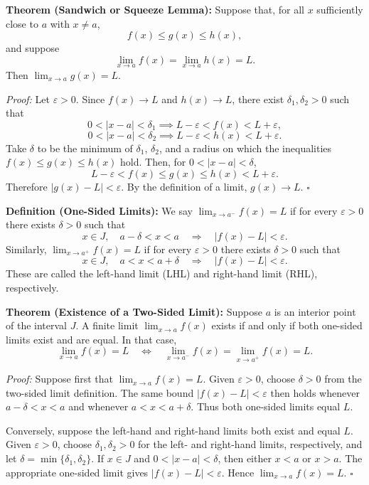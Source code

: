 \documentclass[a4paper,11pt,abstracton]{scrartcl}
\theoremstyle{dotlessP}
\theoremstyle{dotlessS}
\theoremstyle{remark}
\theoremstyle{definition}
\begin{document}
\begin{problem_box}
\textbf{Theorem (Sandwich or Squeeze Lemma):}
Suppose that, for all $x$ sufficiently close to $a$ with $x\ne a$,
\[
f(x)\le g(x)\le h(x),
\]
and suppose
\[
\lim_{x\to a}f(x)=\lim_{x\to a}h(x)=L.
\]
Then $\displaystyle\lim_{x\to a}g(x)=L$.
\end{problem_box}

\begin{claim_box}
\textit{Proof:}
Let $\varepsilon>0$. Since $f(x)\to L$ and $h(x)\to L$, there exist $\delta_1,\delta_2>0$ such that
\[
0<|x-a|<\delta_1\implies L-\varepsilon<f(x)<L+\varepsilon,
\]
\[
0<|x-a|<\delta_2\implies L-\varepsilon<h(x)<L+\varepsilon.
\]
Take $\delta$ to be the minimum of $\delta_1$, $\delta_2$, and a radius on which the inequalities $f(x)\le g(x)\le h(x)$ hold. Then, for $0<|x-a|<\delta$,
\[
L-\varepsilon<f(x)\le g(x)\le h(x)<L+\varepsilon.
\]
Therefore $|g(x)-L|<\varepsilon$. By the definition of a limit, $g(x)\to L$.
\hfill$\square$
\end{claim_box}

\begin{problem_box}
\textbf{Definition (One-Sided Limits):}
We say $\lim_{x\to a^-}f(x)=L$ if for every $\varepsilon>0$ there exists $\delta>0$ such that
\[
 x\in J,\quad a-\delta<x<a\quad\Longrightarrow\quad |f(x)-L|<\varepsilon.
\]
Similarly, $\lim_{x\to a^+}f(x)=L$ if for every $\varepsilon>0$ there exists $\delta>0$ such that
\[
 x\in J,\quad a<x<a+\delta\quad\Longrightarrow\quad |f(x)-L|<\varepsilon.
\]
These are called the left-hand limit (LHL) and right-hand limit (RHL), respectively.
\end{problem_box}

\begin{problem_box}
\textbf{Theorem (Existence of a Two-Sided Limit):}
Suppose $a$ is an interior point of the interval $J$. A finite limit $\lim_{x\to a}f(x)$ exists if and only if both one-sided limits exist and are equal. In that case,
\[
\lim_{x\to a}f(x)=L
\quad\Longleftrightarrow\quad
\lim_{x\to a^-}f(x)=\lim_{x\to a^+}f(x)=L.
\]
\end{problem_box}

\begin{claim_box}
\textit{Proof:}
Suppose first that $\lim_{x\to a}f(x)=L$. Given $\varepsilon>0$, choose $\delta>0$ from the two-sided limit definition. The same bound $|f(x)-L|<\varepsilon$ then holds whenever $a-\delta<x<a$ and whenever $a<x<a+\delta$. Thus both one-sided limits equal $L$.

Conversely, suppose the left-hand and right-hand limits both exist and equal $L$. Given $\varepsilon>0$, choose $\delta_1,\delta_2>0$ for the left- and right-hand limits, respectively, and let $\delta=\min\{\delta_1,\delta_2\}$. If $x\in J$ and $0<|x-a|<\delta$, then either $x<a$ or $x>a$. The appropriate one-sided limit gives $|f(x)-L|<\varepsilon$. Hence $\lim_{x\to a}f(x)=L$.
\hfill$\square$
\end{claim_box}
\end{document}
